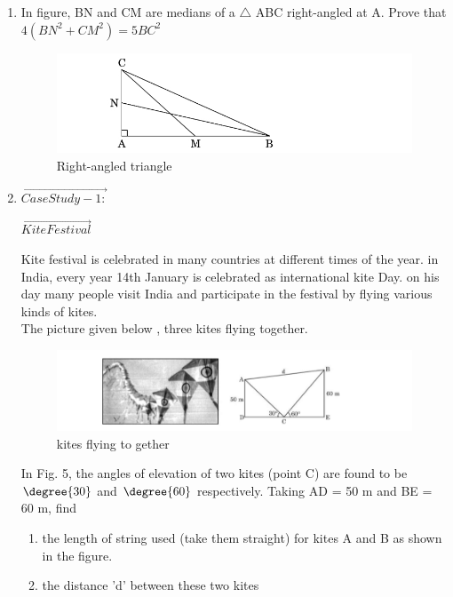 \begin{enumerate}
\item In figure, BN and CM are medians of a $\triangle$ ABC right-angled at A. Prove that $4(BN^2 +CM^2) = 5BC^2$ 
\begin{figure}[!ht]
\centering
\includegraphics[width=\columnwidth]{figs/rightangled}
\caption{Right-angled triangle}
\label{fig:rightangled4}
\end{figure}
\item $\vec{Case Study - 1:}$
\begin{center}
$\vec{Kite Festival}$\\
\end{center}
Kite festival is celebrated in many countries at different times of the year. in India, every year 14th
January is celebrated as international kite Day. on his day many people visit India and participate in the festival by flying various kinds of kites.
\\The picture given below , three kites flying together.
\begin{figure}[!ht]
\centering
\includegraphics[width=\columnwidth]{figs/kites}
\caption{kites flying to gether}
\label{fig:kites5}
\end{figure}
In Fig. 5, the angles of elevation of two kites (point C) are found to be $\degree{30}$ and  $\degree{60}$ respectively. Taking AD = 50 m and BE = 60 m, find 
\begin{enumerate}
\item the length of string used (take them straight) for kites A and B as shown in the figure.
\item the distance 'd' between these two kites
\end{enumerate}
\end{enumerate}
	
